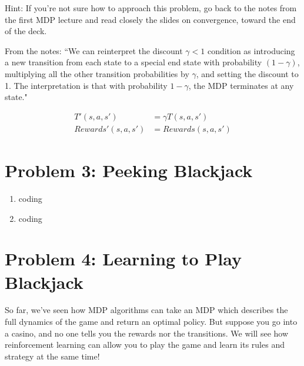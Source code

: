 \documentclass[10pt]{article}
\begin{document}
\begin{enumerate}[label=(\alph*)]
  Hint: If you're not sure how to approach this problem, go back to the notes from the first MDP lecture and read closely the slides on convergence, toward the end of the deck.
  
  From the notes: ``We can reinterpret the discount $\gamma < 1$ condition as introducing a new transition from each state to a special end state with probability $(1 - \gamma)$, multiplying all the other transition probabilities by $\gamma$, and setting the discount to 1. The interpretation is that with probability $1 - \gamma$, the MDP terminates at any state."
  
  \begin{align*}
  		T'(s,a,s') &= \gamma T(s,a,s')\\
  		Rewards'(s,a,s') &= Rewards(s,a,s')
  \end{align*}

\end{enumerate}

\section*{\normalsize Problem 3: Peeking Blackjack}

\begin{enumerate}[label=(\alph*)]

  \item coding
  
  \item coding
		
\end{enumerate}

\section*{\normalsize Problem 4: Learning to Play Blackjack}

So far, we've seen how MDP algorithms can take an MDP which describes the full dynamics of the game and return an optimal policy. But suppose you go into a casino, and no one tells you the rewards nor the transitions. We will see how reinforcement learning can allow you to play the game and learn its rules and strategy at the same time!
\end{document}
